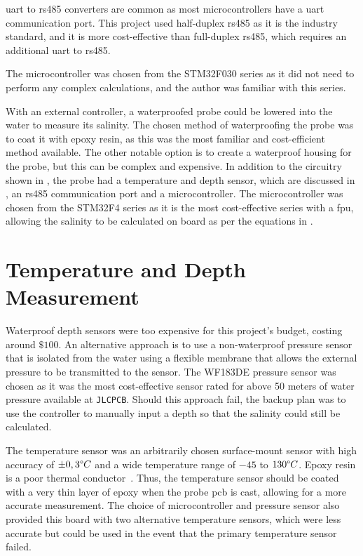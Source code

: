 \Gls{uart} to \gls{rs485} converters are common as most microcontrollers have a \gls{uart} communication port.
This project used half-duplex \gls{rs485} as it is the industry standard, and it is more cost-effective than full-duplex \gls{rs485}, which requires an additional \gls{uart} to \gls{rs485}.

The microcontroller was chosen from the STM32F030 series as it did not need to perform any complex calculations, and the author was familiar with this series.

With an external controller, a waterproofed probe could be lowered into the water to measure its salinity.
The chosen method of waterproofing the probe was to coat it with epoxy resin, as this was the most familiar and cost-efficient method available.
The other notable option is to create a waterproof housing for the probe, but this can be complex and expensive.
In addition to the circuitry shown in , the probe had a temperature and depth sensor, which are discussed in , an \gls{rs485} communication port and a microcontroller.
The microcontroller was chosen from the STM32F4 series as it is the most cost-effective series with a \gls{fpu}, allowing the salinity to be calculated on board as per the equations in .


\section{Temperature and Depth Measurement}\label{sec:temp-depth-measurement}

Waterproof depth sensors were too expensive for this project's budget, costing around $\$100$.
An alternative approach is to use a non-waterproof pressure sensor that is isolated from the water using a flexible membrane that allows the external pressure to be transmitted to the sensor.
The WF183DE pressure sensor was chosen as it was the most cost-effective sensor rated for above 50 meters of water pressure available at \texttt{JLCPCB}.
Should this approach fail, the backup plan was to use the controller to manually input a depth so that the salinity could still be calculated.

The temperature sensor was an arbitrarily chosen surface-mount sensor with high accuracy of $\pm 0,3\degree C$ and a wide temperature range of $-45$ to $130\degree C$.
Epoxy resin is a poor thermal conductor~\cite{epotek_thermally_conductive_epoxies}. 
Thus, the temperature sensor should be coated with a very thin layer of epoxy when the probe \gls{pcb} is cast, allowing for a more accurate measurement.
The choice of microcontroller and pressure sensor also provided this board with two alternative temperature sensors, which were less accurate but could be used in the event that the primary temperature sensor failed.